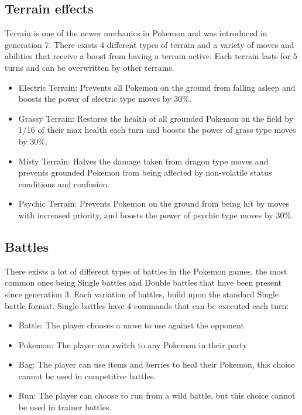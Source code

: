 \subsection{Terrain effects}
Terrain is one of the newer mechanics in Pokemon and was introduced in generation 7. There exists 4 different types of terrain and a variety of moves and abilities
that receive a boost from having a terrain active. Each terrain lasts for 5 turns and can be overwritten by other terrains. \cite{Terrain}
\begin{itemize}
  \item Electric Terrain: Prevents all Pokemon on the ground from falling asleep and boosts the power of electric type moves by 30\%.
  \item Grassy Terrain: Restores the health of all grounded Pokemon on the field by 1/16 of their max health each turn and boosts the power of grass type moves by 30\%.
  \item Misty Terrain: Halves the damage taken from dragon type moves and prevents grounded Pokemon from being affected by non-volatile status conditions and 
    confusion.
  \item Psychic Terrain: Prevents Pokemon on the ground from being hit by moves with increased priority, and boosts the power of psychic type moves by 30\%.
\end{itemize}

\subsection{Battles}
There exists a lot of different types of battles in the Pokemon games, the most common ones being Single battles and Double battles that have been present 
since generation 3. Each variation of battles, build upon the standard Single battle format. Single battles have 4 commands that can be executed each turn:
\cite{PokemonBattles}
\begin{itemize}
  \item Battle: The player chooses a move to use against the opponent
  \item Pokemon: The player can switch to any Pokemon in their party 
  \item Bag: The player can use items and berries to heal their Pokemon, this choice cannot be used in competitive battles.
  \item Run: The player can choose to run from a wild battle, but this choice cannot be used in trainer battles.
\end{itemize}
